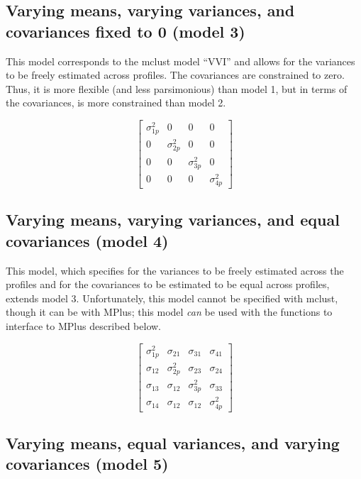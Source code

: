 \documentclass[]{msu-thesis}
\theoremstyle{definition}
\theoremstyle{definition}
\theoremstyle{definition}
\theoremstyle{remark}
\begin{document}
\begin{appendices}
\subsection{Varying means, varying variances, and covariances fixed to 0
(model
3)}\label{varying-means-varying-variances-and-covariances-fixed-to-0-model-3}

This model corresponds to the mclust model ``VVI'' and allows for the
variances to be freely estimated across profiles. The covariances are
constrained to zero. Thus, it is more flexible (and less parsimonious)
than model 1, but in terms of the covariances, is more constrained than
model 2.

\[
\left[ \begin{matrix} { \sigma }_{ 1p }^{ 2 } & 0 & 0 & 0 \\ 0 & { \sigma }_{ 2p }^{ 2 } & 0 & 0 \\ 0 & 0 & { \sigma }_{ 3p }^{ 2 } & 0 \\ 0 & 0 & 0 & { \sigma }_{ 4p }^{ 2 } \end{matrix} \right]
\]

\subsection{Varying means, varying variances, and equal covariances
(model
4)}\label{varying-means-varying-variances-and-equal-covariances-model-4}

This model, which specifies for the variances to be freely estimated
across the profiles and for the covariances to be estimated to be equal
across profiles, extends model 3. Unfortunately, this model cannot be
specified with mclust, though it can be with MPlus; this model
\emph{can} be used with the functions to interface to MPlus described
below.

\[
\left[ \begin{matrix} { \sigma }_{ 1p }^{ 2 } & { \sigma }_{ 21 } & { \sigma }_{ 31 } & { \sigma }_{ 41 } \\ { \sigma }_{ 12 } & { \sigma }_{ 2p }^{ 2 } & { \sigma }_{ 23 } & { \sigma }_{ 24 } \\ { \sigma }_{ 13 } & { \sigma }_{ 12 } & { \sigma }_{ 3p }^{ 2 } & { \sigma }_{ 33 } \\ { \sigma }_{ 14 } & { \sigma }_{ 12 } & { \sigma }_{ 12 } & { \sigma }_{ 4p }^{ 2 } \end{matrix} \right]
\]

\subsection{Varying means, equal variances, and varying covariances
(model
5)}\label{varying-means-equal-variances-and-varying-covariances-model-5}


\end{appendices}
\end{document}
